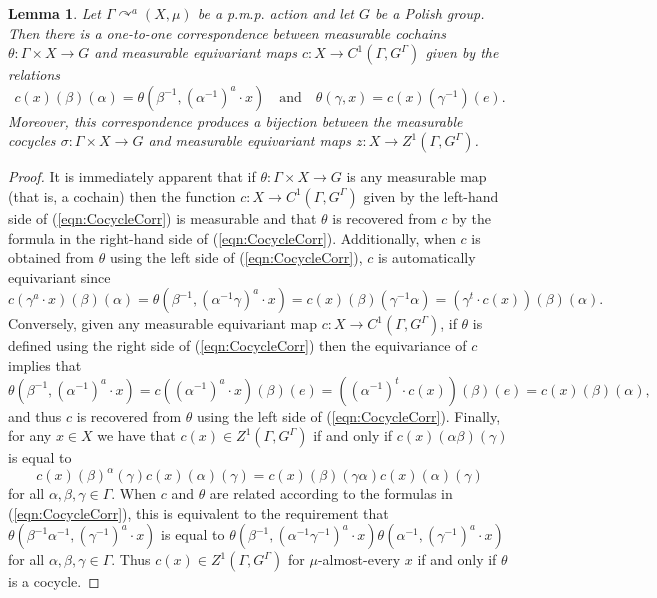 \documentclass[12pt]{amsart}
\newtheorem{lem}[thm]{Lemma}
\theoremstyle{definition}
\newcommand{\pmp}{p{$.$}m{$.$}p{$.$}}
\newcommand{\acts}{\curvearrowright}
\begin{document}
\begin{lem} \label{lem:CocycleCorr}
	Let $\Gamma \acts^a (X, \mu)$ be a {\pmp} action and let $G$ be a Polish group. Then there is a one-to-one correspondence between measurable cochains $\theta : \Gamma \times X \rightarrow G$ and measurable equivariant maps $c : X \rightarrow C^1(\Gamma, G^\Gamma)$ given by the relations
	\begin{equation} \label{eqn:CocycleCorr}
		c(x)(\beta)(\alpha) = \theta(\beta^{-1}, (\alpha^{-1})^a \cdot x) \quad \text{and} \quad \theta(\gamma, x) = c(x)(\gamma^{-1})(e).
	\end{equation}
	Moreover, this correspondence produces a bijection between the measurable cocycles $\sigma : \Gamma \times X \rightarrow G$ and measurable equivariant maps $z : X \rightarrow Z^1(\Gamma, G^\Gamma)$.
\end{lem}

\begin{proof}
	It is immediately apparent that if $\theta : \Gamma \times X \rightarrow G$ is any measurable map (that is, a cochain) then the function $c : X \rightarrow C^1(\Gamma, G^\Gamma)$ given by the left-hand side of (\ref{eqn:CocycleCorr}) is measurable and that $\theta$ is recovered from $c$ by the formula in the right-hand side of (\ref{eqn:CocycleCorr}). Additionally, when $c$ is obtained from $\theta$ using the left side of (\ref{eqn:CocycleCorr}), $c$ is automatically equivariant since
	\[c(\gamma^a \cdot x)(\beta)(\alpha) = \theta(\beta^{-1}, (\alpha^{-1} \gamma)^a \cdot x) = c(x)(\beta)(\gamma^{-1} \alpha) = (\gamma^t \cdot c(x))(\beta)(\alpha).\]
	Conversely, given any measurable equivariant map $c : X \rightarrow C^1(\Gamma, G^\Gamma)$, if $\theta$ is defined using the right side of (\ref{eqn:CocycleCorr}) then the equivariance of $c$ implies that
	\[\theta(\beta^{-1}, (\alpha^{-1})^a \cdot x) = c((\alpha^{-1})^a \cdot x)(\beta)(e) = ((\alpha^{-1})^t \cdot c(x))(\beta)(e) = c(x)(\beta)(\alpha),\]
	and thus $c$ is recovered from $\theta$ using the left side of (\ref{eqn:CocycleCorr}). Finally, for any $x \in X$ we have that $c(x) \in Z^1(\Gamma, G^\Gamma)$ if and only if $c(x)(\alpha \beta)(\gamma)$ is equal to
	\[c(x)(\beta)^\alpha(\gamma) c(x)(\alpha)(\gamma) = c(x)(\beta)(\gamma \alpha) c(x)(\alpha)(\gamma)\]
	for all $\alpha, \beta, \gamma \in \Gamma$. When $c$ and $\theta$ are related according to the formulas in (\ref{eqn:CocycleCorr}), this is equivalent to the requirement that $\theta(\beta^{-1} \alpha^{-1}, (\gamma^{-1})^a \cdot x)$ is equal to $\theta(\beta^{-1}, (\alpha^{-1} \gamma^{-1})^a \cdot x) \theta(\alpha^{-1}, (\gamma^{-1})^a \cdot x)$ for all $\alpha, \beta, \gamma \in \Gamma$. Thus $c(x) \in Z^1(\Gamma, G^\Gamma)$ for $\mu$-almost-every $x$ if and only if $\theta$ is a cocycle.
\end{proof}
\end{document}
